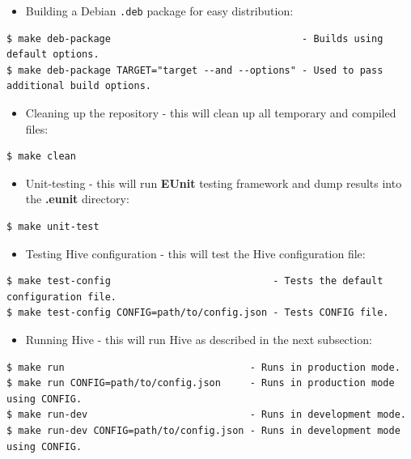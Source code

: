 \documentclass[a4paper]{article}
\begin{document}
\begin{itemize}
\item Building a Debian \texttt{.deb} package for easy distribution:
\end{itemize}


\begin{verbatim}
$ make deb-package                                 - Builds using default options.
$ make deb-package TARGET="target --and --options" - Used to pass additional build options.
\end{verbatim}




\begin{itemize}
\item Cleaning up the repository - this will clean up all temporary and compiled files:
\end{itemize}


\begin{verbatim}
$ make clean
\end{verbatim}




\begin{itemize}
\item Unit-testing - this will run \textbf{EUnit} testing framework and dump results into the \textbf{.eunit} directory:
\end{itemize}


\begin{verbatim}
$ make unit-test
\end{verbatim}




\begin{itemize}
\item Testing Hive configuration - this will test the Hive configuration file:
\end{itemize}


\begin{verbatim}
$ make test-config                            - Tests the default configuration file.
$ make test-config CONFIG=path/to/config.json - Tests CONFIG file.
\end{verbatim}




\begin{itemize}
\item Running Hive - this will run Hive as described in the next subsection:
\end{itemize}


\begin{verbatim}
$ make run                                - Runs in production mode.
$ make run CONFIG=path/to/config.json     - Runs in production mode using CONFIG.
$ make run-dev                            - Runs in development mode.
$ make run-dev CONFIG=path/to/config.json - Runs in development mode using CONFIG.
\end{verbatim}
\end{document}
